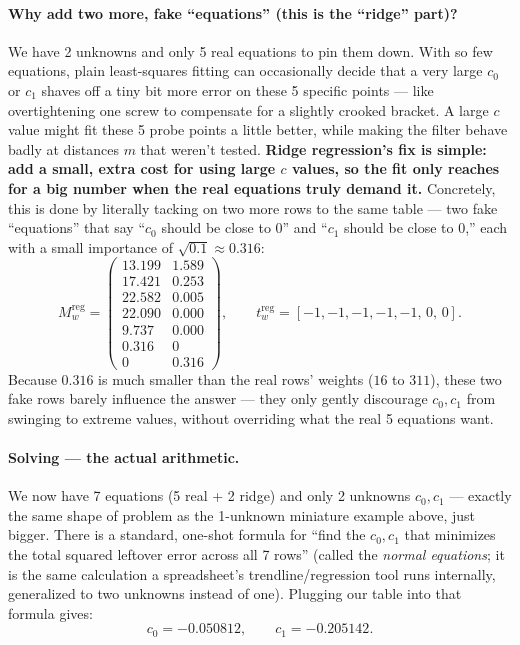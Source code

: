 \documentclass[11pt]{article}
\begin{document}
\paragraph{Why add two more, fake ``equations'' (this is the ``ridge'' part)?}
We have 2 unknowns and only 5 real equations to pin them down. With so few equations, plain least-squares fitting can occasionally decide that a very large $c_0$ or $c_1$ shaves off a tiny bit more error on these 5 specific points --- like overtightening one screw to compensate for a slightly crooked bracket. A large $c$ value might fit these 5 probe points a little better, while making the filter behave badly at distances $m$ that weren't tested. \textbf{Ridge regression's fix is simple: add a small, extra cost for using large $c$ values, so the fit only reaches for a big number when the real equations truly demand it.} Concretely, this is done by literally tacking on two more rows to the same table --- two fake ``equations'' that say ``$c_0$ should be close to $0$'' and ``$c_1$ should be close to $0$,'' each with a small importance of $\sqrt{0.1}\approx0.316$:
\[
M_w^{\text{reg}} = \begin{pmatrix}
13.199 & 1.589 \\
17.421 & 0.253 \\
22.582 & 0.005 \\
22.090 & 0.000 \\
9.737 & 0.000 \\
0.316 & 0 \\
0 & 0.316
\end{pmatrix}, \qquad t_w^{\text{reg}} = [-1,-1,-1,-1,-1,\,0,\,0].
\]
Because $0.316$ is much smaller than the real rows' weights ($16$ to $311$), these two fake rows barely influence the answer --- they only gently discourage $c_0,c_1$ from swinging to extreme values, without overriding what the real 5 equations want.

\paragraph{Solving --- the actual arithmetic.}
We now have 7 equations (5 real + 2 ridge) and only 2 unknowns $c_0,c_1$ --- exactly the same shape of problem as the 1-unknown miniature example above, just bigger. There is a standard, one-shot formula for ``find the $c_0,c_1$ that minimizes the total squared leftover error across all 7 rows'' (called the \emph{normal equations}; it is the same calculation a spreadsheet's trendline/regression tool runs internally, generalized to two unknowns instead of one). Plugging our table into that formula gives:
\[
\boxed{c_0 = -0.050812, \qquad c_1 = -0.205142.}
\]
\end{document}

